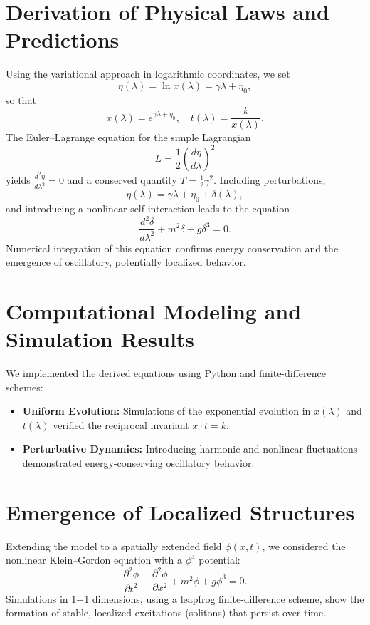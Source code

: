 \documentclass{article}
\begin{document}
\section{Derivation of Physical Laws and Predictions}
Using the variational approach in logarithmic coordinates, we set
\[
\eta(\lambda) = \ln x(\lambda) = \gamma \lambda + \eta_0,
\]
so that
\[
x(\lambda) = e^{\gamma \lambda + \eta_0},\quad t(\lambda) = \frac{k}{x(\lambda)}.
\]
The Euler–Lagrange equation for the simple Lagrangian
\[
L = \frac{1}{2}\left(\frac{d\eta}{d\lambda}\right)^2
\]
yields \(\frac{d^2\eta}{d\lambda^2}=0\) and a conserved quantity \(T=\frac{1}{2}\gamma^2\). Including perturbations,
\[
\eta(\lambda) = \gamma \lambda + \eta_0 + \delta(\lambda),
\]
and introducing a nonlinear self-interaction leads to the equation
\[
\frac{d^2\delta}{d\lambda^2} + m^2 \delta + g \delta^3 = 0.
\]
Numerical integration of this equation confirms energy conservation and the emergence of oscillatory, potentially localized behavior.

\section{Computational Modeling and Simulation Results}
We implemented the derived equations using Python and finite-difference schemes:
\begin{itemize}
    \item \textbf{Uniform Evolution:} Simulations of the exponential evolution in \(x(\lambda)\) and \(t(\lambda)\) verified the reciprocal invariant \(x \cdot t = k\).
    \item \textbf{Perturbative Dynamics:} Introducing harmonic and nonlinear fluctuations demonstrated energy-conserving oscillatory behavior.
\end{itemize}

\section{Emergence of Localized Structures}
Extending the model to a spatially extended field \(\phi(x,t)\), we considered the nonlinear Klein--Gordon equation with a \(\phi^4\) potential:
\[
\frac{\partial^2 \phi}{\partial t^2} - \frac{\partial^2 \phi}{\partial x^2} + m^2 \phi + g \phi^3 = 0.
\]
Simulations in 1+1 dimensions, using a leapfrog finite-difference scheme, show the formation of stable, localized excitations (solitons) that persist over time.
\end{document}
